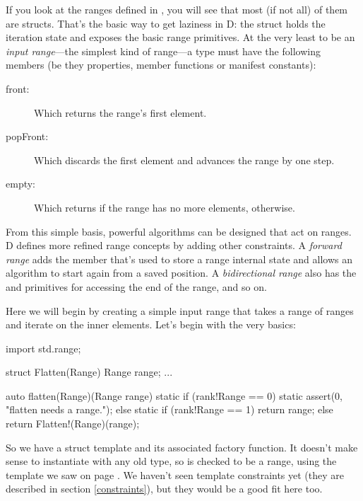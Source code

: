 If you look at the ranges defined in , you will see that most (if not all) of them are structs. That's the basic way to get laziness in D: the struct holds the iteration state and exposes the basic range primitives. At the very least to be an \emph{input range}---the simplest kind of range---a type must have the following members (be they properties, member functions or manifest constants):

\begin{description}
\item[front:] Which returns the range's first element.
\item[popFront:] Which discards the first element and advances the range by one step.
\item[empty:] Which returns  if the range has no more elements,  otherwise.
\end{description}

From this simple basis, powerful algorithms can be designed that act on ranges. D defines more refined range concepts by adding other constraints. A \emph{forward range} adds the  member that's used to store a range internal state and allows an algorithm to start again from a saved position. A \emph{bidirectional range} also has the  and  primitives for accessing the end of the range, and so on.

Here we will begin by creating a simple input range that takes a range of ranges and iterate on the inner elements. Let's begin with the very basics:

\begin{dcode}
import std.range;

struct Flatten(Range)
{
    Range range;
    ...
}

auto flatten(Range)(Range range)
{ 
    static if (rank!Range == 0)
        static assert(0, "flatten needs a range.");
    else static if (rank!Range == 1)
        return range;
    else
        return Flatten!(Range)(range);
}
\end{dcode}

So we have a struct template and its associated factory function. It doesn't make sense to instantiate  with any old type, so  is checked to be a range, using the  template we saw on page \pageref{rankforranges}. We haven't seen template constraints yet (they are described in section \ref{constraints}), but they would be a good fit here too.

